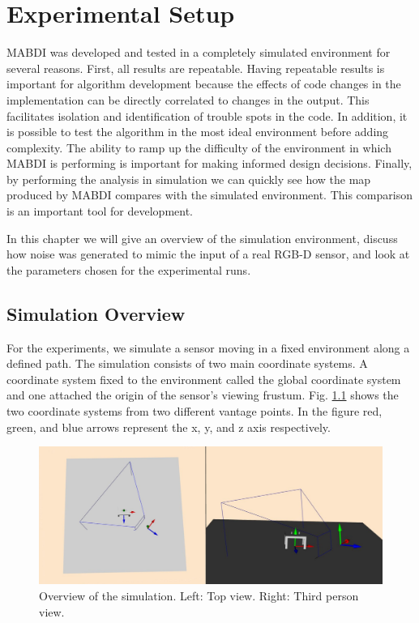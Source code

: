 \chapter{Experimental Setup}	\label{chapter:experimental_setup}

MABDI was developed and tested in a completely simulated environment for several
reasons. First, all results are repeatable. Having repeatable results is
important for algorithm development because the effects of code changes in the
implementation can be directly correlated to changes in the output. This
facilitates isolation and identification of trouble spots in the code. In
addition, it is possible to test the algorithm in the most ideal environment
before adding complexity. The ability to ramp up the difficulty of the
environment in which MABDI is performing is important for making informed design
decisions. Finally, by performing the analysis in simulation we can quickly see
how the map produced by MABDI compares with the simulated environment. This
comparison is an important tool for development.

In this chapter we will give an overview of the simulation environment, discuss
how noise was generated to mimic the input of a real RGB-D sensor, and look at
the parameters chosen for the experimental runs.

\section{Simulation Overview}

For the experiments, we simulate a sensor moving in a fixed environment along a
defined path. The simulation consists of two main coordinate systems. A
coordinate system fixed to the environment called the global coordinate system
and one attached the origin of the sensor's viewing frustum. Fig.
\ref{fig:simulation_overview} shows the two coordinate systems from two
different vantage points. In the figure red, green, and blue arrows represent
the x, y, and z axis respectively.

\begin{figure}[h]%
\centering
  \includegraphics[width=\textwidth]{figures/expsetup_simulation_overview.pdf}
  \caption{Overview of the simulation. Left: Top view. Right: Third person view. }
  \label{fig:simulation_overview}
\end{figure}

